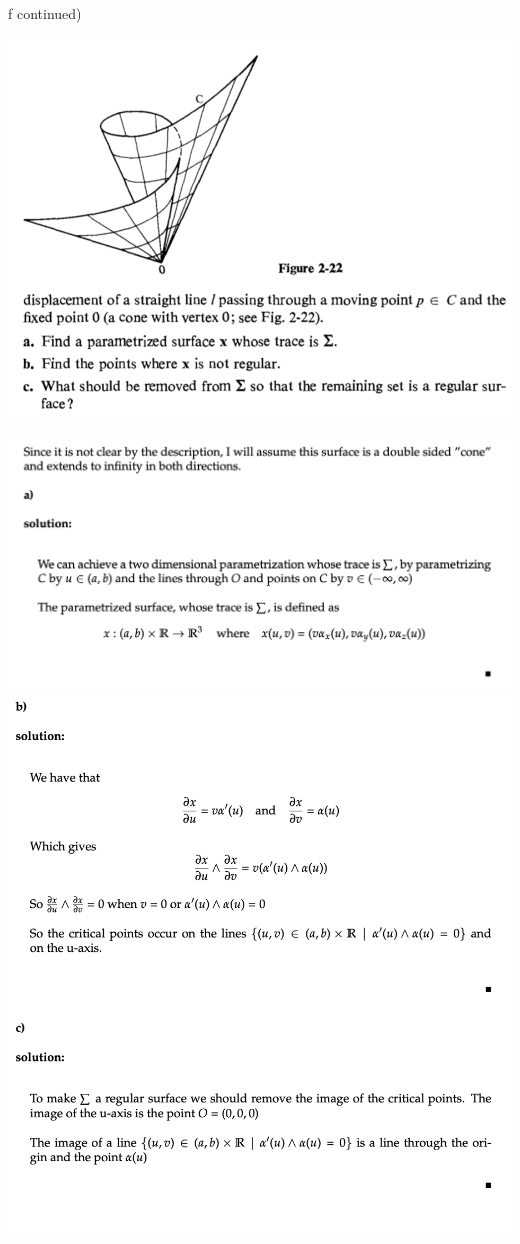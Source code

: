 \documentclass[10pt,letterpaper]{hmcpset}
\begin{document}
\newpage \begin{problem}
f continued) 

\includegraphics[scale=0.7]{Cf2.png}
\end{problem}
\begin{solution}
  \includegraphics[scale=.8]{C_f1_solution.png}
  \includegraphics[scale=.8]{C_f2_solution.png}
\end{solution}
\end{document}
